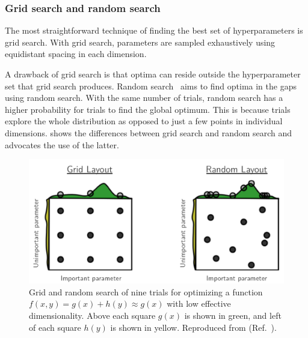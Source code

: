 \subsubsection{Grid search and random search}
The most straightforward technique of finding the best set of hyperparameters is grid search.
With grid search, parameters are sampled exhaustively using equidistant spacing in each dimension.

A drawback of grid search is that optima can reside outside the hyperparameter set that grid search produces.
Random search~ aims to find optima in the gaps using random search.
With the same number of trials, random search has a higher probability for trials to find the global optimum.
This is because trials explore the whole distribution as opposed to just a few points in individual dimensions.
 shows the differences between grid search and random search and advocates the use of the latter.

\begin{figure}
    \includegraphics[width=\linewidth]{images/gridrandsearch.png}
    \caption[Grid and random search]{
        Grid and random search of nine trials for optimizing a function $f(x, y) = g(x) + h(y) \approx g(x)$ with low effective dimensionality.
        Above each square $g(x)$ is shown in green, and left of each square $h(y)$ is shown in yellow.
        Reproduced from  (Ref.~\cite{Bergstra2012}).
    }
    \label{fig:gridrandsearch}
\end{figure}

